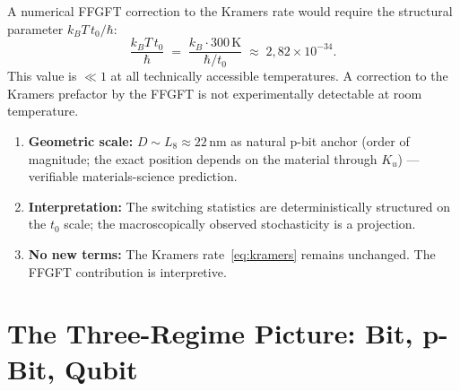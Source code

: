 	A numerical FFGFT correction to the Kramers rate would require the
	structural parameter $k_BT\,t_0/\hbar$:
	\begin{equation}
		\frac{k_B T\,t_0}{\hbar}
		\;=\; \frac{k_B \cdot 300\,\text{K}}{\hbar/t_0}
		\;\approx\; 2{,}82 \times 10^{-34}.
		\label{eq:structural-parameter}
	\end{equation}
	This value is $\ll 1$ at all technically accessible temperatures.
	A correction to the Kramers prefactor by the FFGFT is not
	experimentally detectable at room temperature.
	
	\begin{keypoint}
		\begin{enumerate}
			\item \textbf{Geometric scale:} $D \sim L_8 \approx 22\,\text{nm}$
			as natural p-bit anchor (order of magnitude; the exact position
			depends on the material through $K_u$) --- verifiable materials-science
			prediction.
			\item \textbf{Interpretation:} The switching statistics are deterministically
			structured on the $t_0$ scale; the macroscopically observed
			stochasticity is a projection.
			\item \textbf{No new terms:} The Kramers rate~\eqref{eq:kramers}
			remains unchanged. The FFGFT contribution is interpretive.
		\end{enumerate}
	\end{keypoint}
	
	\section{The Three-Regime Picture: Bit, p-Bit, Qubit}
	\label{sec:three-regimes}
	
